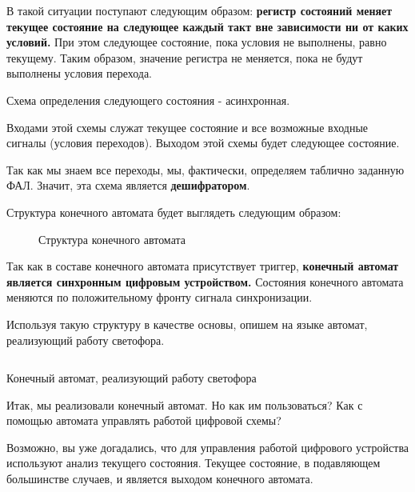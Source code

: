 \par{В такой ситуации поступают следующим образом: \textbf{регистр состояний меняет текущее состояние на следующее каждый такт вне зависимости ни от каких условий.} При этом следующее состояние, пока условия не выполнены, равно текущему. Таким образом, значение регистра не меняется, пока не будут выполнены условия перехода.}

\par{Схема определения следующего состояния - асинхронная.}

\par{Входами этой схемы служат текущее состояние и все возможные входные сигналы (условия переходов). Выходом этой схемы будет следующее состояние.}

\par{Так как мы знаем все переходы, мы, фактически, определяем таблично заданную ФАЛ. Значит, эта схема является \textbf{дешифратором}.}

\par{Структура конечного автомата будет выглядеть следующим образом:}

\begin{figure}[H]
  \centering
  \def\svgwidth{12cm}
  
  \caption{Структура конечного автомата}
\end{figure}

\par{Так как в составе конечного автомата присутствует триггер, \textbf{конечный автомат является синхронным цифровым устройством.} Состояния конечного автомата меняются по положительному фронту сигнала синхронизации.}

\par{Используя такую структуру в качестве основы, опишем на языке  автомат, реализующий работу светофора.}

%

\begin{longlisting}[H]
	\inputminted{SystemVerilog}{code_examples/lab_4/lights.sv}
	\caption{Конечный автомат, реализующий работу светофора}
\end{longlisting}
\bigskip

\par{Итак, мы реализовали конечный автомат. Но как им пользоваться? Как с помощью автомата управлять работой цифровой схемы?}

\par{Возможно, вы уже догадались, что для управления работой цифрового устройства используют анализ текущего состояния. Текущее состояние, в подавляющем большинстве случаев, и является выходом конечного автомата.}

